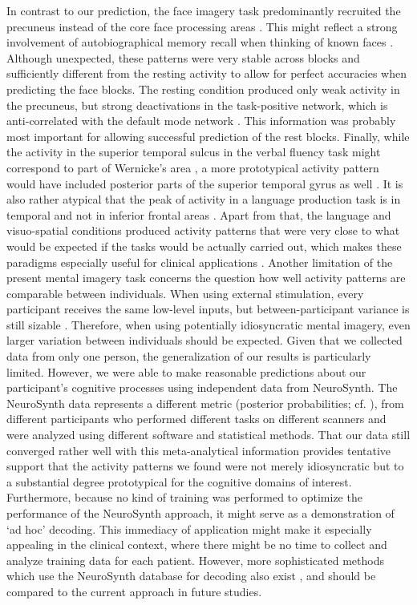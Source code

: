 \documentclass[fleqn,10pt]{SelfArx} %
\begin{document}
In contrast to our prediction, the face imagery task predominantly recruited the precuneus instead of the core face processing areas \citep{Haxby_2000}. This might reflect a strong involvement of autobiographical memory recall when thinking of known faces \citep{Gobbini_2007}. Although unexpected, these patterns were very stable across blocks and sufficiently different from the resting activity to allow for perfect accuracies when predicting the face blocks. The resting condition produced only weak activity in the precuneus, but strong deactivations in the task-positive network, which is anti-correlated with the default mode network \citep{Fox_2005}. This information was probably most important for allowing successful prediction of the rest blocks.
Finally, while the activity in the superior temporal sulcus in the verbal fluency task might correspond to part of Wernicke's area \citep{Price_2011}, a more prototypical activity pattern would have included posterior parts of the superior temporal gyrus as well \citep{Tremblay_2016}. It is also rather atypical that the peak of activity in a language production task is in temporal and not in inferior frontal areas \citep{Woermann_2003}. Apart from that, the language and visuo-spatial conditions produced activity patterns that were very close to what would be expected if the tasks would be actually carried out, which makes these paradigms especially useful for clinical applications \citep{Woermann_2003, Jokeit_2001}.
Another limitation of the present mental imagery task concerns the question how well activity patterns are comparable between individuals. When using external stimulation, every participant receives the same low-level inputs, but between-participant variance is still sizable \citep{Haxby_2011}. Therefore, when using potentially idiosyncratic mental imagery, even larger variation between individuals should be expected. Given that we collected data from only one person, the generalization of our results is particularly limited. However, we were able to make reasonable predictions about our participant's cognitive processes using independent data from NeuroSynth. The NeuroSynth data represents a different metric (posterior probabilities; cf. \citet{Yarkoni_2011}), from different participants who performed different tasks on different scanners and were analyzed using different software and statistical methods. That our data still converged rather well with this meta-analytical information provides tentative support that the activity patterns we found were not merely idiosyncratic but to a substantial degree prototypical for the cognitive domains of interest. Furthermore, because no kind of training was performed to optimize the performance of the NeuroSynth approach, it might serve as a demonstration of ‘ad hoc’ decoding. This immediacy of application might make it especially appealing in the clinical context, where there might be no time to collect and analyze training data for each patient. However, more sophisticated methods which use the NeuroSynth database for decoding also exist \citep{Rubin_2017}, and should be compared to the current approach in future studies.
\end{document}
